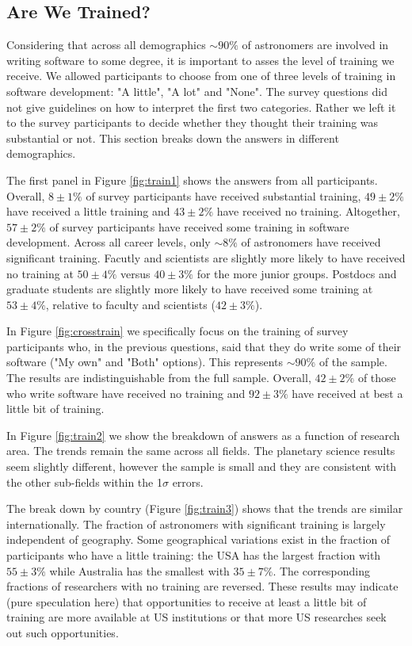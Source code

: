 \subsection{Are We Trained?}

Considering that across all demographics $\sim90\%$ of astronomers are involved in writing software to some degree, it is important to asses the level of training we receive. We allowed participants to choose from one of three levels of training in software development: "A little", "A lot" and "None". The survey questions did not give guidelines on how to interpret the first two categories. Rather we left it to the survey participants to decide whether they thought their training was substantial or not. This section breaks down the answers in different demographics. 

The first panel in Figure \ref{fig:train1} shows the answers from all participants. Overall, $8\pm1\%$ of survey participants have received substantial training, $49\pm2\%$ have received a little training and $43\pm2\%$ have received no training. Altogether, $57\pm2\%$ of survey participants have received some training in software development. Across all career levels, only $\sim8\%$ of astronomers have received significant training. Facutly and scientists are slightly more likely to have received no training at $50\pm4\%$ versus $40\pm3\%$ for the more junior groups. Postdocs and graduate students are slightly more likely to have received some training at $53\pm4\%$, relative to faculty and scientists ($42\pm3\%$).

In Figure \ref{fig:crosstrain} we specifically focus on the training of survey participants who, in the previous questions, said that they do write some of their software ("My own" and "Both" options). This represents $\sim90\%$ of the sample. The results are indistinguishable from the full sample. Overall, $42\pm2\%$ of those who write software have received no training and $92\pm3\%$ have received at best a little bit of training.

In Figure \ref{fig:train2} we show the breakdown of answers as a function of research area. The trends remain the same across all fields. The planetary science results seem slightly different, however the sample is small and they are consistent with the other sub-fields within the 1$\sigma$ errors. 

The break down by country (Figure \ref{fig:train3}) shows that the trends are similar internationally. The fraction of astronomers with significant training is largely independent of geography. Some geographical variations exist in the fraction of participants who have a little training: the USA has the largest fraction with $55\pm3\%$ while Australia has the smallest with $35\pm7\%$. The corresponding fractions of researchers with no training are reversed. These results may indicate (pure speculation here) that opportunities to receive at least a little bit of training are more available at US institutions or that more US researches seek out such opportunities. 

